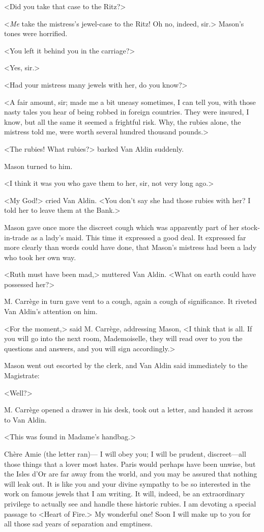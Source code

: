<Did you take that case to the Ritz?>

<\emph{Me} take the mistress's jewel-case to the Ritz! Oh no, indeed, sir.> Mason's tones were horrified.

<You left it behind you in the carriage?>

<Yes, sir.>

<Had your mistress many jewels with her, do you know?>

<A fair amount, sir; made me a bit uneasy sometimes, I can tell you, with those nasty tales you hear of being robbed in foreign countries. They were insured, I know, but all the same it seemed a frightful risk. Why, the rubies alone, the mistress told me, were worth several hundred thousand pounds.>

<The rubies! What rubies?> barked Van Aldin suddenly.

Mason turned to him.

<I think it was you who gave them to her, sir, not very long ago.>

<My God!> cried Van Aldin. <You don't say she had those rubies with her? I told her to leave them at the Bank.>

Mason gave once more the discreet cough which was apparently part of her stock-in-trade as a lady's maid. This time it expressed a good deal. It expressed far more clearly than words could have done, that Mason's mistress had been a lady who took her own way.

<Ruth must have been mad,> muttered Van Aldin. <What on earth could have possessed her?>

M. Carrège in turn gave vent to a cough, again a cough of significance. It riveted Van Aldin's attention on him.

<For the moment,> said M. Carrège, addressing Mason, <I think that is all. If you will go into the next room, Mademoiselle, they will read over to you the questions and answers, and you will sign accordingly.>

Mason went out escorted by the clerk, and Van Aldin said immediately to the Magistrate:

<Well?>

M. Carrège opened a drawer in his desk, took out a letter, and handed it across to Van Aldin.

<This was found in Madame's handbag.>

\begin{mail}{}{Chère Amie (the letter ran)—}
I will obey you; I will be prudent, discreet—all those things that a lover most hates. Paris would perhaps have been unwise, but the Isles d'Or are far away from the world, and you may be assured that nothing will leak out. It is like you and your divine sympathy to be so interested in the work on famous jewels that I am writing. It will, indeed, be an extraordinary privilege to actually see and handle these historic rubies. I am devoting a special passage to <Heart of Fire.> My wonderful one! Soon I will make up to you for all those sad years of separation and emptiness.

\end{mail}